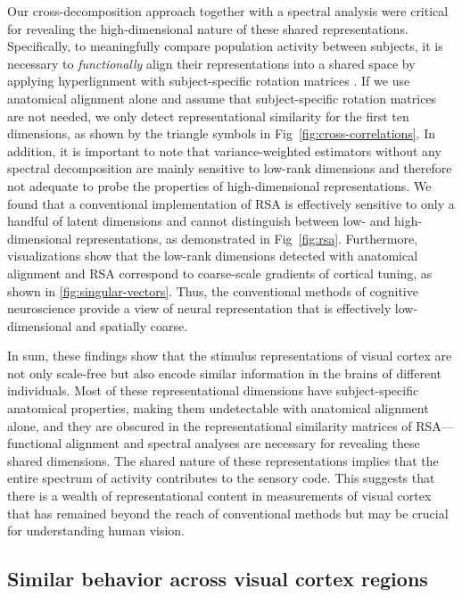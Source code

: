 \documentclass[10pt]{article}
\begin{document}
Our cross-decomposition approach together with a spectral analysis were critical for revealing the high-dimensional nature of these shared representations. Specifically, to meaningfully compare population activity between subjects, it is necessary to \emph{functionally} align their representations into a shared space by applying hyperlignment with subject-specific rotation matrices \autocite{Haxby2011}. If we use anatomical alignment alone and assume that subject-specific rotation matrices are not needed, we only detect representational similarity for the first ten dimensions, as shown by the triangle symbols in Fig~\ref{fig:cross-correlations}. In addition, it is important to note that variance-weighted estimators without any spectral decomposition are mainly sensitive to low-rank dimensions and therefore not adequate to probe the properties of high-dimensional representations. We found that a conventional implementation of RSA is effectively sensitive to only a handful of latent dimensions and cannot distinguish between low- and high-dimensional representations, as demonstrated in Fig~\ref{fig:rsa}. Furthermore, visualizations show that the low-rank dimensions detected with anatomical alignment and RSA correspond to coarse-scale gradients of cortical tuning, as shown in \ref{fig:singular-vectors}. Thus, the conventional methods of cognitive neuroscience provide a view of neural representation that is effectively low-dimensional and spatially coarse.

In sum, these findings show that the stimulus representations of visual cortex are not only scale-free but also encode similar information in the brains of different individuals. Most of these representational dimensions have subject-specific anatomical properties, making them undetectable with anatomical alignment alone, and they are obscured in the representational similarity matrices of RSA---functional alignment and spectral analyses are necessary for revealing these shared dimensions. The shared nature of these representations implies that the entire spectrum of activity contributes to the sensory code. This suggests that there is a wealth of representational content in measurements of visual cortex that has remained beyond the reach of conventional methods but may be crucial for understanding human vision.

\subsection{Similar behavior across visual cortex regions}\label{similar-behavior-across-visual-cortex-regions}
\end{document}
